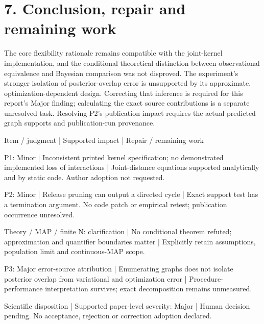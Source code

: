 \documentclass[10pt]{article}
\begin{document}
\section*{7. Conclusion, repair and remaining work}
The core flexibility rationale remains compatible with the joint-kernel implementation, and the conditional theoretical distinction between observational equivalence and Bayesian comparison was not disproved. The experiment’s stronger isolation of posterior-overlap error is unsupported by its approximate, optimization-dependent design. Correcting that inference is required for this report’s Major finding; calculating the exact source contributions is a separate unresolved task. Resolving P2’s publication impact requires the actual predicted graph supports and publication-run provenance.\par
Item / judgment | Supported impact | Repair / remaining work\par
P1: Minor | Inconsistent printed kernel specification; no demonstrated implemented loss of interactions | Joint-distance equations supported analytically and by static code. Author adoption not requested.\par
P2: Minor | Release pruning can output a directed cycle | Exact support test has a termination argument. No code patch or empirical retest; publication occurrence unresolved.\par
Theory / MAP / finite N: clarification | No conditional theorem refuted; approximation and quantifier boundaries matter | Explicitly retain assumptions, population limit and continuous-MAP scope.\par
P3: Major error-source attribution | Enumerating graphs does not isolate posterior overlap from variational and optimization error | Procedure-performance interpretation survives; exact decomposition remains unmeasured.\par
Scientific disposition | Supported paper-level severity: Major | Human decision pending. No acceptance, rejection or correction adoption declared.\par
\end{document}
